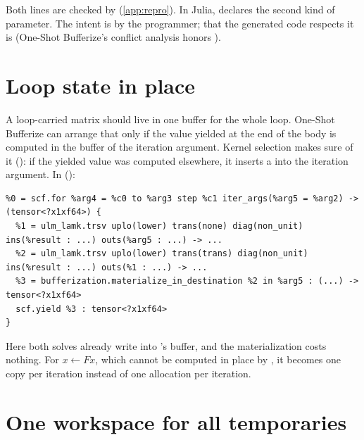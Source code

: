 Both lines are checked by 
(\cref{app:repro}). In Julia,  declares the second
kind of parameter. The intent is \Odecl{} by the programmer; that the
generated code respects it is \Oana{} (One-Shot Bufferize's conflict
analysis honors ).

\section{Loop state in place}
\label{sec:storage-loops}

A loop-carried matrix should live in one buffer for the whole loop.
One-Shot Bufferize can arrange that only if the value yielded at the end of
the body is computed in the buffer of the iteration argument. Kernel
selection makes sure of it (): if
the yielded value was computed elsewhere, it inserts a
 into the iteration
argument. In  ():

\begin{lstlisting}
%0 = scf.for %arg4 = %c0 to %arg3 step %c1 iter_args(%arg5 = %arg2) -> (tensor<?x1xf64>) {
  %1 = ulm_lamk.trsv uplo(lower) trans(none) diag(non_unit) ins(%result : ...) outs(%arg5 : ...) -> ...
  %2 = ulm_lamk.trsv uplo(lower) trans(trans) diag(non_unit) ins(%result : ...) outs(%1 : ...) -> ...
  %3 = bufferization.materialize_in_destination %2 in %arg5 : (...) -> tensor<?x1xf64>
  scf.yield %3 : tensor<?x1xf64>
}
\end{lstlisting}

Here both solves already write into 's buffer, and the
materialization costs nothing. For \(x \leftarrow Fx\), which cannot be
computed in place by , it becomes one copy per iteration instead
of one allocation per iteration.

\section{One workspace for all temporaries}
\label{sec:storage-workspace}

